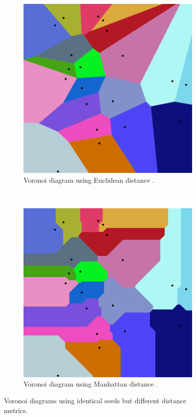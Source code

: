 \begin{figure}[H]
  \centering
  \begin{subfigure}[b]{0.35\textwidth}
    \includegraphics[width=\linewidth]{figure/voronoi_euclidean.png}
    \caption{Voronoi diagram using Euclidean distance \cite{voronoi_euclidean}.}
    \label{fig:voronoi_euclidean}
  \end{subfigure}
  ~
  \begin{subfigure}[b]{0.35\textwidth}
    \includegraphics[width=\linewidth]{figure/voronoi_manhattan.png}
    \caption{Voronoi diagram using Manhattan distance \cite{voronoi_manhattan}.}
    \label{fig:voronoi_manhattan}
  \end{subfigure}
  \caption{Voronoi diagrams using identical seeds but different distance metrics.}
  \label{fig:voronoi}
\end{figure}
